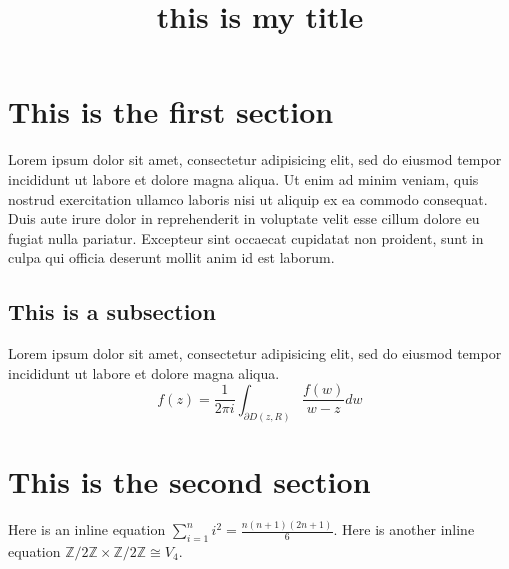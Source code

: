 \documentclass{article}
\title{this is my title}
\begin{document}
\section{This is the first section}

Lorem ipsum dolor sit amet, consectetur adipisicing elit, sed do eiusmod tempor incididunt ut labore et dolore magna aliqua. Ut enim ad minim veniam, quis nostrud exercitation ullamco laboris nisi ut aliquip ex ea commodo consequat. Duis aute irure dolor in reprehenderit in voluptate velit esse cillum dolore eu fugiat nulla pariatur. Excepteur sint occaecat cupidatat non proident, sunt in culpa qui officia deserunt mollit anim id est laborum.

\subsection{This is a subsection}

Lorem ipsum dolor sit amet, consectetur adipisicing elit, sed do eiusmod tempor incididunt ut labore et dolore magna aliqua.
\begin{equation}\tag{1}
  f(z) = \frac{1}{2\pi i} \int_{\partial D(z, R)} \frac{f(w)}{w-z} dw
\end{equation}

\section{This is the second section}

Here is an inline equation $\sum\limits_{i=1}^{n} i^2 = \frac{n(n+1)(2n+1)}{6}$.
Here is another inline equation $\mathbb{Z} / 2\mathbb{Z} \times \mathbb{Z} / 2\mathbb{Z} \cong V_{4}$.
\end{document}
